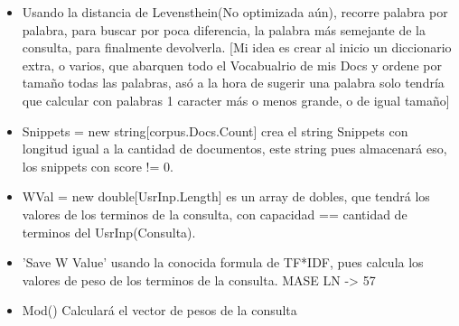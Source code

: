 \documentclass{article}
\begin{document}
\begin{enumerate}
\begin{itemize}
            \newpage
            \begin{itemize}
                \item Usando la distancia de Levensthein(No optimizada aún), recorre palabra por palabra, para buscar por poca diferencia, la palabra más semejante de la consulta, para finalmente devolverla. [Mi idea es crear al inicio un diccionario extra, o varios, que abarquen todo el Vocabualrio de mis Docs y ordene por tamaño todas las palabras, asó a la hora de sugerir una palabra solo tendría que calcular con palabras 1 caracter más o menos grande, o de igual tamaño]
                \item Snippets = new string[corpus.Docs.Count] crea el string Snippets con longitud igual a la cantidad de documentos, este string pues almacenará eso, los snippets con score != 0.
                \item WVal = new double[UsrInp.Length] es un array de dobles, que tendrá los valores de los terminos de la consulta, con capacidad == cantidad de terminos del UsrInp(Consulta).
                \item 'Save W Value' usando la conocida formula de TF*IDF, pues calcula los valores de peso de los terminos de la consulta. MASE LN -> 57
                \item Mod() Calculará el vector de pesos de la consulta
                


\end{itemize}
\end{itemize}
\end{enumerate}
\end{document}
